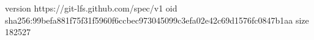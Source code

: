 version https://git-lfs.github.com/spec/v1
oid sha256:99befa881f75f31f5960f6ccbec973045099c3efa02e42c69d1576fc0847b1aa
size 182527
